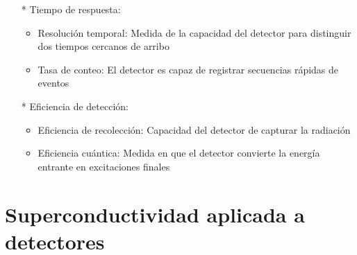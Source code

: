 \documentclass{beamer}
\begin{document}
\begin{frame}
\begin{itemize}
												\item[*] \alert{Tiempo de respuesta:}
																\begin{itemize}
																				\item Resolución temporal:
																								Medida de la capacidad del
																								detector para distinguir dos
																								tiempos cercanos de arribo
																				\item Tasa de conteo: 
																								El detector es capaz de
																								registrar secuencias rápidas de
																								eventos
																\end{itemize}
												\item[*] \alert{Eficiencia de detección:}
																\begin{itemize}
																				\item Eficiencia de recolección:
																								Capacidad del detector de
																								capturar la radiación
																				\item Eficiencia cuántica: 
																								Medida en que el detector
																								convierte la energía entrante en
																								excitaciones finales
																\end{itemize}
								\end{itemize}
\end{frame}


\section{Superconductividad aplicada a detectores}
\end{document}
